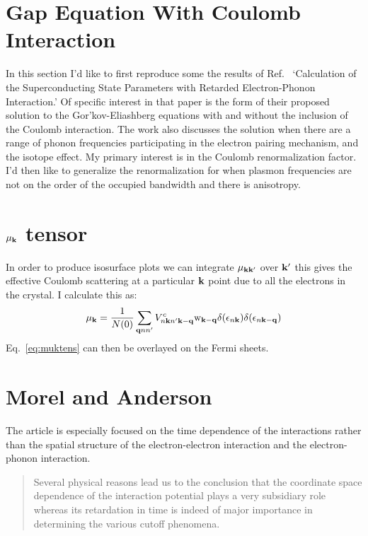 \section{Gap Equation With Coulomb Interaction}
In this section I'd like to first reproduce some the results of Ref.~\cite{morel62} `Calculation
of the Superconducting State Parameters with Retarded Electron-Phonon Interaction.' Of specific interest
in that paper is the form of their proposed solution to the Gor'kov-Eliashberg equations with and without
the inclusion of the Coulomb interaction. The work also discusses the solution when there are a range of phonon
frequencies participating in the electron pairing mechanism, and the isotope effect. My primary interest is
in the Coulomb renormalization factor. I'd then like to generalize the renormalization for when plasmon frequencies
are not on the order of the occupied bandwidth and there is anisotropy.
%
\section{$\mu_{{\bf k}}$ tensor}
%
In order to produce isosurface plots we can integrate $\mu_{{\bf k}{\bf k}'}$ over ${\bf k}'$ this
gives the effective Coulomb scattering at a particular ${\bf k}$ point due to 
all the electrons in the crystal. I calculate this as:
%
\begin{equation}
\label{eq:muktens}
\mu_{{\bf k}} = \frac{1}{N(0)}\sum_{{\bf q} nn'}V^{c}_{n{\bf k} n'{\bf k}-{\bf q}}{\rm w}_{{\bf k}-{\bf q}}\delta(\epsilon_{n{\bf k}})\delta(\epsilon_{n{\bf k}-{\bf q}})
\end{equation}
%
Eq.~\ref{eq:muktens} can then be overlayed on the Fermi sheets. 


\section{Morel and Anderson}
%
The article is especially focused on the time dependence of the interactions rather than the
spatial structure of the electron-electron interaction and the electron-phonon interaction.
%
\begin{quote}
Several physical reasons lead us to the conclusion that the coordinate space dependence
of the interaction potential plays a very subsidiary role whereas its retardation 
in time is indeed of major importance in determining the various cutoff phenomena.
\end{quote}
%

